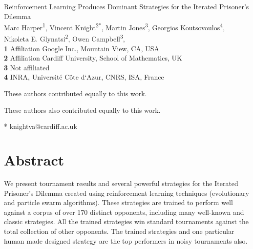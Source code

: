 \documentclass[10pt,letterpaper]{article}
\date{}
\begin{document}
\vspace*{0.2in}

\begin{flushleft}
{\Large
\textbf\newline
{ Reinforcement Learning Produces Dominant Strategies for the Iterated Prisoner's Dilemma }
}
\newline
\\
Marc Harper\textsuperscript{1\Yinyang},
Vincent Knight\textsuperscript{2*\Yinyang},
Martin Jones\textsuperscript{3\ddag},
Georgios Koutsovoulos\textsuperscript{4\ddag},
Nikoleta E. Glynatsi\textsuperscript{2\ddag},
Owen Campbell\textsuperscript{3\ddag},
\\
\bigskip
\textbf{1} Affiliation Google Inc., Mountain View, CA, USA
\\
\textbf{2} Affiliation Cardiff University, School of Mathematics, UK
\\
\textbf{3} Not affiliated
\\
\textbf{4} INRA, Université Côte d‘Azur, CNRS, ISA, France
\\
\bigskip

%
%
\Yinyang These authors contributed equally to this work.

\ddag These authors also contributed equally to this work.


* knightva@cardiff.ac.uk

\end{flushleft}
\section*{Abstract}
    We present tournament results and several powerful strategies for the Iterated
    Prisoner's Dilemma created using reinforcement learning techniques
    (evolutionary and particle swarm algorithms). These strategies are
    trained to perform well against a corpus of over 170 distinct
    opponents, including many well-known and classic strategies. All
    the trained strategies win standard tournaments against the total collection
    of other opponents. The trained strategies and one particular human made
    designed strategy are the top performers in noisy tournaments also.
\linenumbers
\end{document}
